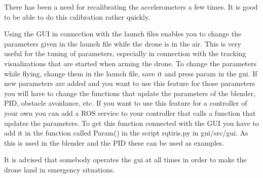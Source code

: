 \documentclass[titlepage,11pt,a4paper]{article}
\begin{document}
There has been a need for recalibrating the accelerometers a few times. It is good to be able to do this calibration rather quickly.

Using the GUI in connection with the launch files enables you to change the parameters given in the launch file while the drone is in the air. This is very useful for the tuning of parameters, especially in connection with the tracking visualizations that are started when arming the drone. To change the parameters while flying, change them in the launch file, save it and press param in the gui. If new parameters are added and you want to use this feature for those parameters you will have to change the functions that update the parameters of the blender, PID, obstacle avoidance, etc. If you want to use this feature for a controller of your own you can add a ROS service to your controller that calls a function that updates the parameters. To get this function connected with the GUI you have to add it in the function called Param() in the script rqt\textunderscore iris.py in gui/src/gui. As this is used in the blender and the PID these can be used as examples.

It is advised that somebody operates the gui at all times in order to make the drone land in emergency situations.
\end{document}
